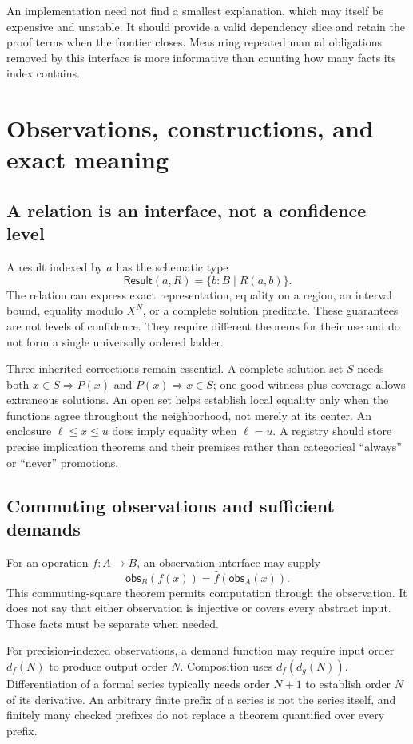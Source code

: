 \documentclass[11pt,letterpaper]{article}
\newcommand{\obs}{\mathsf{obs}}
\theoremstyle{definition}\newtheorem{definition}[proposition]{Definition}
\theoremstyle{remark}\newtheorem{remark}[proposition]{Remark}
\begin{document}
An implementation need not find a smallest explanation, which may itself be
expensive and unstable. It should provide a valid dependency slice and retain
the proof terms when the frontier closes. Measuring repeated manual obligations
removed by this interface is more informative than counting how many facts its
index contains.

\section{Observations, constructions, and exact meaning}\label{sec:observations}

\subsection{A relation is an interface, not a confidence level}
A result indexed by $a$ has the schematic type
\[
 \mathsf{Result}(a,R)=\{b:B\mid R(a,b)\}.
\]
The relation can express exact representation, equality on a region, an
interval bound, equality modulo $X^N$, or a complete solution predicate.
These guarantees are not levels of confidence. They require different
theorems for their use and do not form a single universally ordered ladder.

Three inherited corrections remain essential. A complete solution set $S$
needs both $x\in S\Rightarrow P(x)$ and $P(x)\Rightarrow x\in S$; one good
witness plus coverage allows extraneous solutions. An open set helps establish
local equality only when the functions agree throughout the neighborhood, not
merely at its center. An enclosure $\ell\le x\le u$ does imply equality when
$\ell=u$. A registry should store precise implication theorems and their
premises rather than categorical ``always'' or ``never'' promotions.

\subsection{Commuting observations and sufficient demands}
For an operation $f:A\to B$, an observation interface may supply
\[
 \obs_B(f(x))=\widehat f(\obs_A(x)).
\]
This commuting-square theorem permits computation through the observation.
It does not say that either observation is injective or covers every abstract
input. Those facts must be separate when needed.

For precision-indexed observations, a demand function may require input order
$d_f(N)$ to produce output order $N$. Composition uses
$d_f(d_g(N))$. Differentiation of a formal series typically needs order $N+1$
to establish order $N$ of its derivative. An arbitrary finite prefix of a
series is not the series itself, and finitely many checked prefixes do not
replace a theorem quantified over every prefix.
\end{document}
